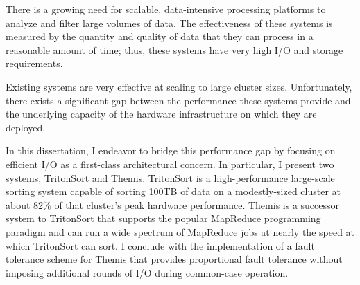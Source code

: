\begin{dissertationabstract}
There is a growing need for scalable, data-intensive processing platforms to
analyze and filter large volumes of data. The effectiveness of these systems is
measured by the quantity and quality of data that they can process in a
reasonable amount of time; thus, these systems have very high I/O and storage
requirements.

Existing systems are very effective at scaling to large cluster
sizes. Unfortunately, there exists a significant gap between the performance
these systems provide and the underlying capacity of the hardware
infrastructure on which they are deployed.

In this dissertation, I endeavor to bridge this performance gap by focusing on
efficient I/O as a first-class architectural concern. In particular, I present
two systems, TritonSort and Themis. TritonSort is a high-performance
large-scale sorting system capable of sorting 100TB of data on a modestly-sized
cluster at about 82\% of that cluster's peak hardware performance. Themis is a
successor system to TritonSort that supports the popular MapReduce programming
paradigm and can run a wide spectrum of MapReduce jobs at nearly the speed at
which TritonSort can sort. I conclude with the implementation of a fault
tolerance scheme for Themis that provides proportional fault tolerance without
imposing additional rounds of I/O during common-case operation.
\end{dissertationabstract}
